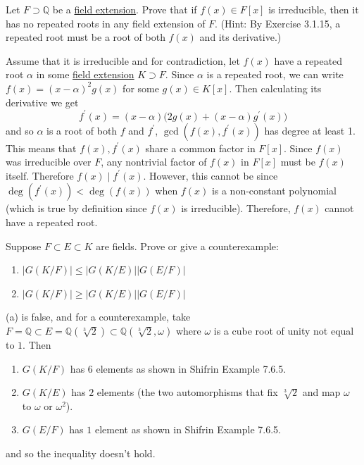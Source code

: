   \begin{exercise}[Shifrin 7.6.2]
    Let $F \supset \mathbb{Q}$ be a \hyperref[def:field-extension]{field extension}. Prove that if $f(x) \in F[x]$ is irreducible, then it has no repeated roots in any field extension of $F$. (Hint: By Exercise 3.1.15, a repeated root must be a root of both $f(x)$ and its derivative.)
  \end{exercise}
  \begin{solution}
    Assume that it is irreducible and for contradiction, let $f(x)$ have a repeated root $\alpha$ in some \hyperref[def:field-extension]{field extension} $K \supset F$. Since $\alpha$ is a repeated root, we can write $f(x) = (x - \alpha)^2 g(x)$ for some $g(x) \in K[x]$. Then calculating its derivative we get 
    \begin{equation}
      f^\prime (x) = (x - \alpha) \big( 2 g(x) + (x - \alpha) g^\prime (x) \big)
    \end{equation}
    and so $\alpha$ is a root of both $f$ and $f^\prime$, $\gcd(f(x), f^\prime(x))$ has degree at least 1. This means that $f(x), f^\prime (x)$ share a common factor in $F[x]$. Since $f(x)$ was irreducible over $F$, any nontrivial factor of $f(x)$ in $F[x]$ must be $f(x)$ itself. Therefore $f(x) \mid f^\prime (x)$. However, this cannot be since $\deg(f^\prime(x)) < \deg(f(x))$ when $f(x)$ is a non-constant polynomial (which is true by definition since $f(x)$ is irreducible). Therefore, $f(x)$ cannot have a repeated root. 
  \end{solution}

  \begin{exercise}[Shifrin 7.6.10]
    Suppose $F \subset E \subset K$ are fields. Prove or give a counterexample:
    \begin{enumerate}[label=\alph*.]
      \item $|G(K/F)| \leq |G(K/E)||G(E/F)|$
      \item $|G(K/F)| \geq |G(K/E)||G(E/F)|$
    \end{enumerate}
  \end{exercise}
  \begin{solution}
    (a) is false, and for a counterexample, take $F = \mathbb{Q}  \subset E = \mathbb{Q}(\sqrt[3]{2}) \subset \mathbb{Q}(\sqrt[3]{2}, \omega)$ where $\omega$ is a cube root of unity not equal to $1$. Then 
    \begin{enumerate}
      \item $G(K/F)$ has $6$ elements as shown in Shifrin Example 7.6.5. 
      \item $G(K/E)$ has $2$ elements (the two automorphisms that fix $\sqrt[3]{2}$ and map $\omega$ to $\omega$ or $\omega^2$). 
      \item $G(E/F)$ has $1$ element as shown in Shifrin Example 7.6.5. 
    \end{enumerate}
    and so the inequality doesn't hold. 
  \end{solution}


